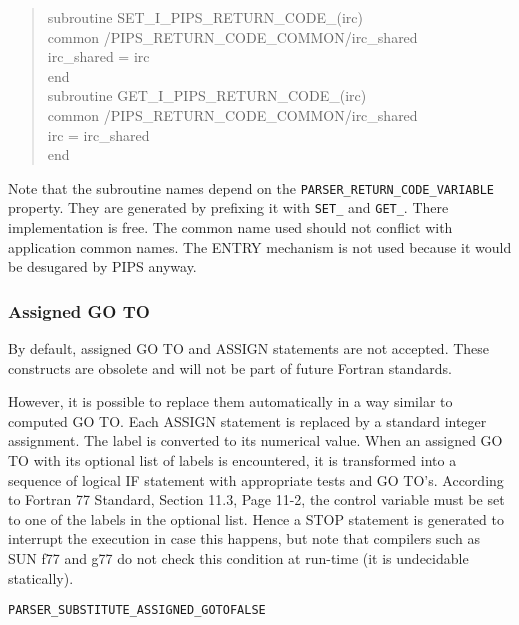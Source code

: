 \documentclass[a4paper]{report}
\newenvironment{PipsProp}{\begin{alltt}}{\end{alltt}}
\begin{document}
\begin{quote}
      subroutine SET\_I\_PIPS\_RETURN\_CODE\_(irc)\\
      common /PIPS\_RETURN\_CODE\_COMMON/irc\_shared\\
      irc\_shared = irc\\
      end\\
      subroutine GET\_I\_PIPS\_RETURN\_CODE\_(irc)\\
      common /PIPS\_RETURN\_CODE\_COMMON/irc\_shared\\
      irc = irc\_shared\\
      end
\end{quote}

Note that the subroutine names depend on the
\verb/PARSER_RETURN_CODE_VARIABLE/ property. They are generated by
prefixing it with \verb/SET_/ and \verb/GET_/. There implementation is
free. The common name used should not conflict with application common
names. The ENTRY mechanism is not used because it would be desugared by
PIPS anyway.

\subsubsection*{Assigned GO TO}

By default, assigned GO TO and ASSIGN statements are not accepted.
These constructs are obsolete and will not be part of future Fortran
standards.

However, it is possible to replace them automatically in a way similar to
computed GO TO. Each ASSIGN statement is replaced by a standard integer
assignment. The label is converted to its numerical value. When an
assigned GO TO with its optional list of labels is encountered, it is
transformed into a sequence of logical IF statement with appropriate tests
and GO TO's. According to Fortran 77 Standard, Section 11.3, Page 11-2,
the control variable must be set to one of the labels in the optional
list. Hence a STOP statement is generated to interrupt the execution in case
this happens, but note that compilers such as SUN f77 and g77 do not check
this condition at run-time (it is undecidable statically).

\begin{PipsProp}
PARSER_SUBSTITUTE_ASSIGNED_GOTO FALSE
\end{PipsProp}
\end{document}
